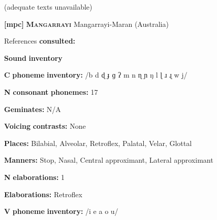 \begin{styleBody}
(adequate texts unavailable)
\end{styleBody}

\begin{styleBody}
\textbf{[mpc]}   \textbf{\textsc{Mangarrayi}  }  Mangarrayi-Maran (Australia)
\end{styleBody}

\begin{styleBody}
References \textbf{consulted:} \citet{Merlan1989}
\end{styleBody}

\begin{styleBody}
\textbf{Sound} \textbf{inventory}
\end{styleBody}

\begin{styleBody}
\textbf{C} \textbf{phoneme} \textbf{inventory:} /b d ɖ ɟ ɡ ʔ m n ɳ ɲ ŋ l ɭ ɹ ɻ w j/
\end{styleBody}

\begin{styleBody}
\textbf{N} \textbf{consonant} \textbf{phonemes:} 17
\end{styleBody}

\begin{styleBody}
\textbf{Geminates:} N/A
\end{styleBody}

\begin{styleBody}
\textbf{Voicing} \textbf{contrasts:} None
\end{styleBody}

\begin{styleBody}
\textbf{Places:} Bilabial, Alveolar, Retroflex, Palatal, Velar, Glottal
\end{styleBody}

\begin{styleBody}
\textbf{Manners:} Stop, Nasal, Central approximant, Lateral approximant
\end{styleBody}

\begin{styleBody}
\textbf{N} \textbf{elaborations:} 1
\end{styleBody}

\begin{styleBody}
\textbf{Elaborations:} Retroflex
\end{styleBody}

\begin{styleBody}
\textbf{V} \textbf{phoneme} \textbf{inventory:} /i e a o u/
\end{styleBody}

